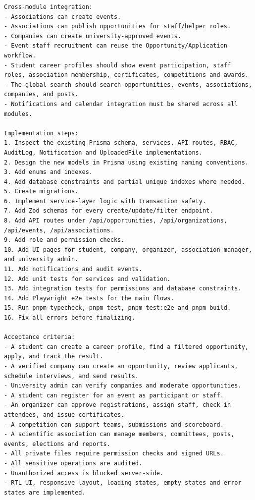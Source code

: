 \documentclass[12pt,a4paper]{article}
\begin{document}
\begin{LTR}
\begin{lstlisting}
Cross-module integration:
- Associations can create events.
- Associations can publish opportunities for staff/helper roles.
- Companies can create university-approved events.
- Event staff recruitment can reuse the Opportunity/Application workflow.
- Student career profiles should show event participation, staff roles, association membership, certificates, competitions and awards.
- The global search should search opportunities, events, associations, companies, and posts.
- Notifications and calendar integration must be shared across all modules.

Implementation steps:
1. Inspect the existing Prisma schema, services, API routes, RBAC, AuditLog, Notification and UploadedFile implementations.
2. Design the new models in Prisma using existing naming conventions.
3. Add enums and indexes.
4. Add database constraints and partial unique indexes where needed.
5. Create migrations.
6. Implement service-layer logic with transaction safety.
7. Add Zod schemas for every create/update/filter endpoint.
8. Add API routes under /api/opportunities, /api/organizations, /api/events, /api/associations.
9. Add role and permission checks.
10. Add UI pages for student, company, organizer, association manager, and university admin.
11. Add notifications and audit events.
12. Add unit tests for services and validation.
13. Add integration tests for permissions and database constraints.
14. Add Playwright e2e tests for the main flows.
15. Run pnpm typecheck, pnpm test, pnpm test:e2e and pnpm build.
16. Fix all errors before finalizing.

Acceptance criteria:
- A student can create a career profile, find a filtered opportunity, apply, and track the result.
- A verified company can create an opportunity, review applicants, schedule interviews, and send results.
- University admin can verify companies and moderate opportunities.
- A student can register for an event as participant or staff.
- An organizer can approve registrations, assign staff, check in attendees, and issue certificates.
- A competition can support teams, submissions and scoreboard.
- A scientific association can manage members, committees, posts, events, elections and reports.
- All private files require permission checks and signed URLs.
- All sensitive operations are audited.
- Unauthorized access is blocked server-side.
- RTL UI, responsive layout, loading states, empty states and error states are implemented.
\end{lstlisting}
\end{LTR}
\end{document}
